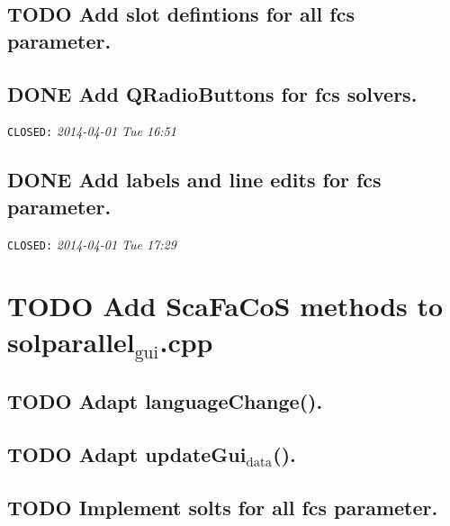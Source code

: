 \documentclass[11pt]{article}
\begin{document}
\subsection{\textbf{TODO} Add slot defintions for all fcs parameter.}
\label{sec-1-1}
\subsection{\textbf{DONE} Add QRadioButtons for fcs solvers.}
\label{sec-1-2}

      \texttt{CLOSED:} \textit{2014-04-01 Tue 16:51}
\subsection{\textbf{DONE} Add labels and line edits for fcs parameter.}
\label{sec-1-3}

      \texttt{CLOSED:} \textit{2014-04-01 Tue 17:29}
\section{\textbf{TODO} Add ScaFaCoS methods to solparallel$_{\mathrm{gui}}$.cpp}
\label{sec-2}
\subsection{\textbf{TODO} Adapt languageChange().}
\label{sec-2-1}
\subsection{\textbf{TODO} Adapt updateGui$_{\mathrm{data}}$().}
\label{sec-2-2}
\subsection{\textbf{TODO} Implement solts for all fcs parameter.}
\label{sec-2-3}
\end{document}
